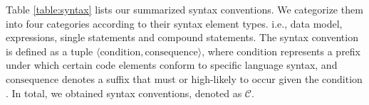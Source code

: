 Table \ref{table:syntax} lists our summarized syntax conventions. We categorize them into four categories according to their syntax element types. i.e., data model, expressions, single statements and compound statements. The syntax convention is defined as a tuple $\langle \text{condition}, \text{consequence} \rangle$, where $\text{condition}$ represents a prefix under which certain code elements conform to specific language syntax, and $\text{consequence}$ denotes a suffix that must or high-likely to occur given the $\text{condition}$. In total, we obtained  syntax conventions, denoted as $\mathcal{C}$.


